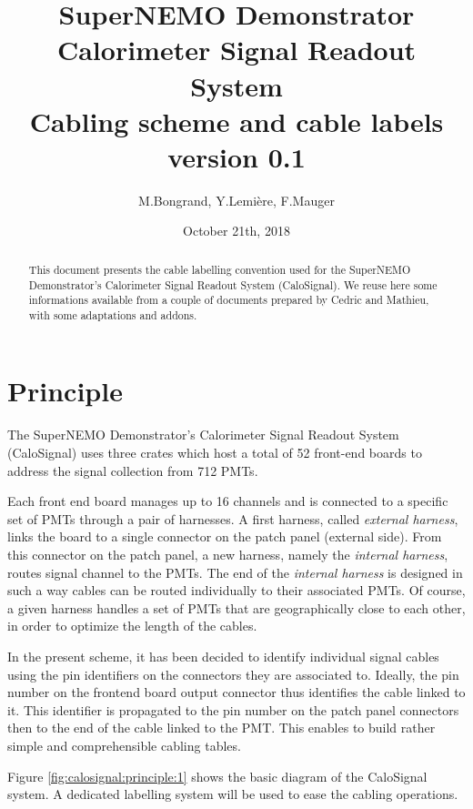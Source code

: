 \documentclass[12pt,a4paper]{article}
\title{SuperNEMO Demonstrator\\
  Calorimeter Signal Readout System\\
  Cabling scheme and cable labels\\
  version 0.1}
\author{M.Bongrand, Y.Lemi\`ere, F.Mauger}
\date{October 21th, 2018}
\begin{document}
\maketitle

\begin{abstract}
  \noindent This document presents the cable labelling convention used
  for  the SuperNEMO  Demonstrator's Calorimeter Signal Readout  System
  (CaloSignal).  We reuse  here some informations available  from a couple
  of documents prepared  by Cedric and Mathieu,  with some adaptations
  and addons.
\end{abstract}

\tableofcontents
\vfill

\clearpage
\section{Principle}

The  SuperNEMO   Demonstrator's  Calorimeter  Signal   Readout  System
(CaloSignal)  uses three  crates which  host a  total of  52 front-end
boards to address the signal collection from 712 PMTs.

Each front end board  manages up to 16 channels and  is connected to a
specific set  of PMTs through a  pair of harnesses.  A  first harness,
called \emph{external harness}, links the  board to a single connector
on the patch  panel (external side). From this connector  on the patch
panel,  a  new harness,  namely  the  \emph{internal harness},  routes
signal channel to the PMTs.  The end of the \emph{internal harness} is
designed in  such a  way cables  can be  routed individually  to their
associated PMTs.   Of course, a  given harness  handles a set  of PMTs
that are geographically close to each  other, in order to optimize the
length of the cables.

In  the present  scheme, it  has been  decided to  identify individual
signal cables  using the  pin identifiers on  the connectors  they are
associated to.  Ideally,  the pin number on the  frontend board output
connector thus identifies the cable  linked to it.  This identifier is
propagated to the pin number on the patch panel connectors then to the
end  of the  cable linked  to the  PMT. This  enables to  build rather
simple and comprehensible cabling tables.

\noindent\par Figure \ref{fig:calosignal:principle:1}  shows the basic
diagram of the CaloSignal system. A dedicated labelling system will be
used to ease the cabling operations.
\end{document}
